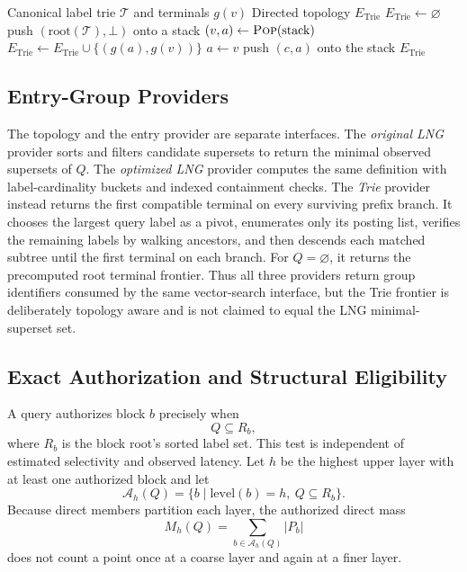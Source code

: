 \documentclass[sigconf,review,anonymous]{acmart}
\begin{document}
\begin{algorithm}[t]
\caption{Prefix-Trie group topology}
\label{alg:trie-topology}
\begin{algorithmic}[1]
\Require Canonical label trie $\mathcal{T}$ and terminals $g(v)$
\Ensure Directed topology $E_{\mathrm{Trie}}$
\State $E_{\mathrm{Trie}}\gets\varnothing$
\State push $(\mathrm{root}(\mathcal{T}),\bot)$ onto a stack
  \State $(v,a)\gets\Call{Pop}{\mathrm{stack}}$
      \State $E_{\mathrm{Trie}}\gets E_{\mathrm{Trie}}\cup\{(g(a),g(v))\}$
    \EndIf
    \State $a\gets v$
  \EndIf
    \State push $(c,a)$ onto the stack
  \EndFor
\EndWhile
\State \Return $E_{\mathrm{Trie}}$
\end{algorithmic}
\end{algorithm}

\subsection{Entry-Group Providers}
The topology and the entry provider are separate interfaces.  The
\emph{original LNG} provider sorts and filters candidate supersets to return
the minimal observed supersets of $Q$.  The \emph{optimized LNG} provider
computes the same definition with label-cardinality buckets and indexed
containment checks.  The \emph{Trie} provider instead returns the first
compatible terminal on every surviving prefix branch.  It chooses the largest
query label as a pivot, enumerates only its posting list, verifies the remaining
labels by walking ancestors, and then descends each matched subtree until the
first terminal on each branch.  For $Q=\varnothing$, it returns the
precomputed root terminal frontier.  Thus all three providers return group
identifiers consumed by the same vector-search interface, but the Trie
frontier is deliberately topology aware and is not claimed to equal the LNG
minimal-superset set.

\subsection{Exact Authorization and Structural Eligibility}
A query authorizes block $b$ precisely when
\begin{equation}
  Q\subseteq R_b,
\end{equation}
where $R_b$ is the block root's sorted label set.  This test is independent of
estimated selectivity and observed latency. Let $h$ be the highest upper layer
with at least one authorized block and let
\begin{equation}
  \mathcal{A}_h(Q)=\{b\mid \mathrm{level}(b)=h,\ Q\subseteq R_b\}.
\end{equation}
Because direct members partition each layer, the authorized direct mass
\begin{equation}
  M_h(Q)=\sum_{b\in\mathcal{A}_h(Q)} |P_b|
\end{equation}
does not count a point once at a coarse layer and again at a finer layer.
\end{document}
